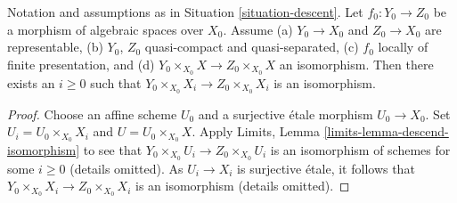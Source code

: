 \begin{lemma}
\label{lemma-descend-equality}
Notation and assumptions as in Situation \ref{situation-descent}.
Let $f_0 : Y_0 \to Z_0$ be a morphism of algebraic spaces over $X_0$.
Assume (a) $Y_0 \to X_0$ and $Z_0 \to X_0$ are representable, (b)
$Y_0$, $Z_0$ quasi-compact and quasi-separated, (c)
$f_0$ locally of finite presentation, and
(d) $Y_0 \times_{X_0} X \to Z_0 \times_{X_0} X$ an isomorphism.
Then there exists an $i \geq 0$ such that
$Y_0 \times_{X_0} X_i \to Z_0 \times_{X_0} X_i$ is an isomorphism.
\end{lemma}

\begin{proof}
Choose an affine scheme $U_0$ and a surjective \'etale morphism $U_0 \to X_0$.
Set $U_i = U_0 \times_{X_0} X_i$ and $U = U_0 \times_{X_0} X$.
Apply Limits, Lemma \ref{limits-lemma-descend-isomorphism}
to see that $Y_0 \times_{X_0} U_i \to Z_0 \times_{X_0} U_i$
is an isomorphism of schemes for some $i \geq 0$ (details omitted).
As $U_i \to X_i$ is surjective \'etale, it follows that
$Y_0 \times_{X_0} X_i \to Z_0 \times_{X_0} X_i$ is an isomorphism
(details omitted).
\end{proof}
